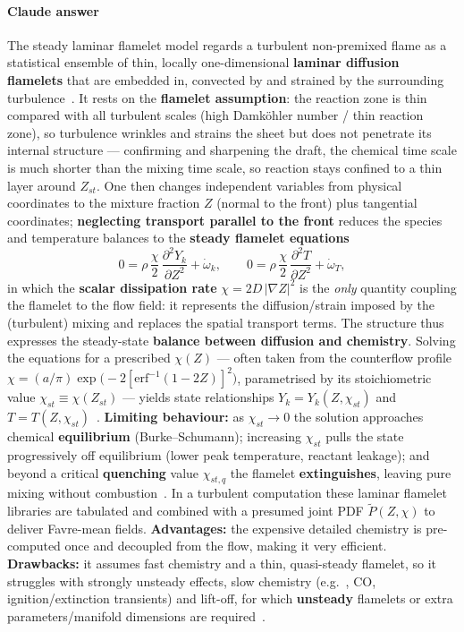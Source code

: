 {\color{istblue}
\paragraph{Claude answer}
The steady laminar flamelet model regards a turbulent non-premixed flame as a statistical ensemble of thin, locally one-dimensional \textbf{laminar diffusion flamelets} that are embedded in, convected by and strained by the surrounding turbulence~\cite{lecture9,peters2000turbulent,warnatz2006combustion}. It rests on the \textbf{flamelet assumption}: the reaction zone is thin compared with all turbulent scales (high Damk\"ohler number / thin reaction zone), so turbulence wrinkles and strains the sheet but does not penetrate its internal structure --- confirming and sharpening the draft, the chemical time scale is much shorter than the mixing time scale, so reaction stays confined to a thin layer around $Z_{st}$. One then changes independent variables from physical coordinates to the mixture fraction $Z$ (normal to the front) plus tangential coordinates; \textbf{neglecting transport parallel to the front} reduces the species and temperature balances to the \textbf{steady flamelet equations}~\cite{lecture9,peters2000turbulent}
\begin{equation*}
0 = \rho\,\frac{\chi}{2}\,\frac{\partial^2 Y_k}{\partial Z^2} + \dot\omega_k, \qquad 0 = \rho\,\frac{\chi}{2}\,\frac{\partial^2 T}{\partial Z^2} + \dot\omega_T,
\end{equation*}
in which the \textbf{scalar dissipation rate} $\chi = 2D\,|\nabla Z|^2$ is the \emph{only} quantity coupling the flamelet to the flow field: it represents the diffusion/strain imposed by the (turbulent) mixing and replaces the spatial transport terms. The structure thus expresses the steady-state \textbf{balance between diffusion and chemistry}. Solving the equations for a prescribed $\chi(Z)$ --- often taken from the counterflow profile $\chi = (a/\pi)\exp\!\big(-2[\mathrm{erf}^{-1}(1-2Z)]^2\big)$, parametrised by its stoichiometric value $\chi_{st}\equiv\chi(Z_{st})$ --- yields state relationships $Y_k = Y_k(Z,\chi_{st})$ and $T = T(Z,\chi_{st})$~\cite{lecture9,poinsot2012theoretical}. \textbf{Limiting behaviour:} as $\chi_{st}\to 0$ the solution approaches chemical \textbf{equilibrium} (Burke--Schumann); increasing $\chi_{st}$ pulls the state progressively off equilibrium (lower peak temperature, reactant leakage); and beyond a critical \textbf{quenching} value $\chi_{st,q}$ the flamelet \textbf{extinguishes}, leaving pure mixing without combustion~\cite{lecture9,peters2000turbulent}. In a turbulent computation these laminar flamelet libraries are tabulated and combined with a presumed joint PDF $\tilde P(Z,\chi)$ to deliver Favre-mean fields. \textbf{Advantages:} the expensive detailed chemistry is pre-computed once and decoupled from the flow, making it very efficient. \textbf{Drawbacks:} it assumes fast chemistry and a thin, quasi-steady flamelet, so it struggles with strongly unsteady effects, slow chemistry (e.g.\ , CO, ignition/extinction transients) and lift-off, for which \textbf{unsteady} flamelets or extra parameters/manifold dimensions are required~\cite{peters2000turbulent,warnatz2006combustion}.
}





